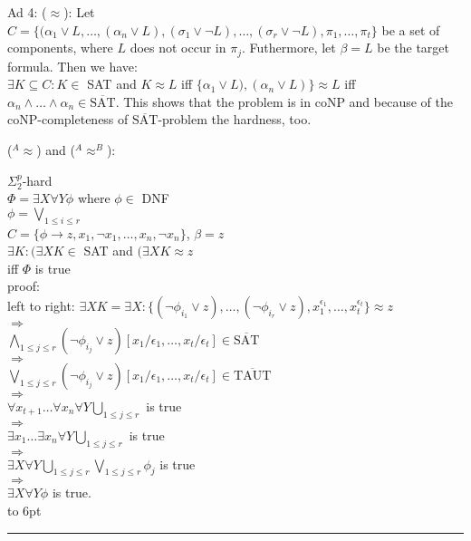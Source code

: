 \documentclass[12pt]{article}
\newcommand{\AEQB}{\mbox{$^A$\hspace{-0.5mm}$\approx^B$}}
\newcommand{\AEQ}{\mbox{$^A$\hspace{-0.5mm}$\approx$}}
\newenvironment{proof}{\parindent=0pt{\bf Proof: }}{
   \hspace*{\fill}\hbox to 6pt{\leaders\hrule width 6pt height 6pt\hfill}\par}
\begin{document}
\begin{proof}
Ad 4: ($\approx$):
Let $C=\{(\alpha_1 \vee L, \ldots, (\alpha_n \vee L), (\sigma_1 \vee \neg L), \ldots, (\sigma_r \vee \neg L), \pi_1, \ldots, \pi_t\}$ be a set of components, where $L$ does not occur in $\pi_j$. Futhermore, let $\beta=L$ be the target formula. Then we have:\\
$\exists K \subseteq C: K \in$ SAT and $K \approx L$ iff $\{\alpha_1 \vee L), (\alpha_n \vee L)\} \approx L$
iff $\alpha_n \wedge \ldots \wedge \alpha_n \in \overline{\mbox{SAT}}$. This shows that the problem is in coNP and because of the coNP-completeness of $\overline{\mbox{SAT}}$-problem the hardness, too.


(\AEQ) and (\AEQB):

$\Sigma^p_2$-hard\\
$\Phi= \exists X \forall Y \phi$ where $\phi \in$ DNF\\
$\phi = \bigvee_{1 \leq i \leq r}$\\

$C =\{\phi \rightarrow z, x_1, \neg x_1, \ldots, x_n, \neg x_n\}$, $\beta=z$\\

$\exists K: ( \exists X K \in$ SAT and $(\exists X K \approx z$\\
iff $\Phi$ is true\\
proof: \\

left to right: $\exists X K = \exists X:\{(\neg \phi_{i_1} \vee z), \ldots, (\neg \phi_{i_r} \vee z), x_1^{\epsilon_1}, \ldots, x_t^{\epsilon_t}\} \approx z$\\
$\Longrightarrow$\\
$\bigwedge_{1 \leq j \leq r} (\neg \phi_{i_j} \vee z)[x_1/\epsilon_1, \ldots, x_t/\epsilon_t] \in
\overline{\mbox{SAT}}$\\
$\Longrightarrow$\\
$\bigvee_{1 \leq j \leq r} (\neg \phi_{i_j} \vee z)[x_1/\epsilon_1, \ldots, x_t/\epsilon_t] \in
\overline{\mbox{TAUT}}$\\
$\Longrightarrow$\\
$\forall x_{t+1} \ldots \forall x_n \forall Y \bigcup_{1 \leq j \leq r} $ is true\\
$\Longrightarrow$\\
$\exists x_1 \ldots \exists x_n \forall Y \bigcup_{1 \leq j \leq r} $ is true\\
$\Longrightarrow$\\
$\exists X \forall Y \bigcup_{1 \leq j \leq r} \bigvee_{1 \leq j \leq r} \phi_j$ is true\\
$\Longrightarrow$\\
$\exists X \forall Y \phi$ is true.\\


\end{proof}
\end{document}
